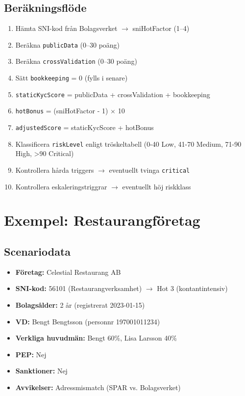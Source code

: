 \documentclass[12pt,a4paper]{article}
\begin{document}
\subsection{Beräkningsflöde}

\begin{enumerate}[noitemsep]
  \item Hämta SNI-kod från Bolagsverket $\rightarrow$ sniHotFactor (1–4)
  \item Beräkna \texttt{publicData} (0–30 poäng)
  \item Beräkna \texttt{crossValidation} (0–30 poäng)
  \item Sätt \texttt{bookkeeping} = 0 (fylls i senare)
  \item \texttt{staticKycScore} = publicData + crossValidation + bookkeeping
  \item \texttt{hotBonus} = (sniHotFactor - 1) $\times$ 10
  \item \texttt{adjustedScore} = staticKycScore + hotBonus
  \item Klassificera \texttt{riskLevel} enligt tröskeltabell (0-40 Low, 41-70 Medium, 71-90 High, >90 Critical)
  \item Kontrollera hårda triggers $\rightarrow$ eventuellt tvinga \texttt{critical}
  \item Kontrollera eskaleringstriggrar $\rightarrow$ eventuellt höj riskklass
\end{enumerate}

\section{Exempel: Restaurangföretag}

\subsection{Scenariodata}

\begin{itemize}[noitemsep]
  \item \textbf{Företag:} Celestial Restaurang AB
  \item \textbf{SNI-kod:} 56101 (Restaurangverksamhet) $\rightarrow$ Hot 3 (kontantintensiv)
  \item \textbf{Bolagsålder:} 2 år (registrerat 2023-01-15)
  \item \textbf{VD:} Bengt Bengtsson (personnr 197001011234)
  \item \textbf{Verkliga huvudmän:} Bengt 60\%, Lisa Larsson 40\%
  \item \textbf{PEP:} Nej
  \item \textbf{Sanktioner:} Nej
  \item \textbf{Avvikelser:} Adressmismatch (SPAR vs. Bolagsverket)
\end{itemize}
\end{document}
